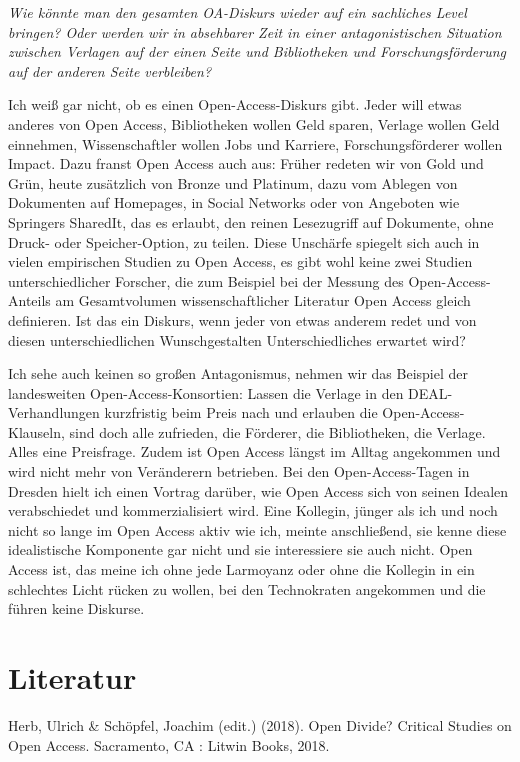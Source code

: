 \documentclass[a4paper,
fontsize=11pt,
oneside,
numbers=noperiodatend,
parskip=half-,
bibliography=totoc,
final
]{scrartcl}
\begin{document}
\emph{Wie könnte man den gesamten OA-Diskurs wieder auf ein sachliches
Level bringen? Oder werden wir in absehbarer Zeit in einer
antagonistischen Situation zwischen Verlagen auf der einen Seite und
Bibliotheken und Forschungsförderung auf der anderen Seite verbleiben?}

Ich weiß gar nicht, ob es einen Open-Access-Diskurs gibt. Jeder will
etwas anderes von Open Access, Bibliotheken wollen Geld sparen, Verlage
wollen Geld einnehmen, Wissenschaftler wollen Jobs und Karriere,
Forschungsförderer wollen Impact. Dazu franst Open Access auch aus:
Früher redeten wir von Gold und Grün, heute zusätzlich von Bronze und
Platinum, dazu vom Ablegen von Dokumenten auf Homepages, in Social
Networks oder von Angeboten wie Springers SharedIt, das es erlaubt, den
reinen Lesezugriff auf Dokumente, ohne Druck- oder Speicher-Option, zu
teilen. Diese Unschärfe spiegelt sich auch in vielen empirischen Studien
zu Open Access, es gibt wohl keine zwei Studien unterschiedlicher
Forscher, die zum Beispiel bei der Messung des Open-Access-Anteils am
Gesamtvolumen wissenschaftlicher Literatur Open Access gleich
definieren. Ist das ein Diskurs, wenn jeder von etwas anderem redet und
von diesen unterschiedlichen Wunschgestalten Unterschiedliches erwartet
wird?

Ich sehe auch keinen so großen Antagonismus, nehmen wir das Beispiel der
landesweiten Open-Access-Konsortien: Lassen die Verlage in den
DEAL-Verhandlungen kurzfristig beim Preis nach und erlauben die
Open-Access-Klauseln, sind doch alle zufrieden, die Förderer, die
Bibliotheken, die Verlage. Alles eine Preisfrage. Zudem ist Open Access
längst im Alltag angekommen und wird nicht mehr von Veränderern
betrieben. Bei den Open-Access-Tagen in Dresden hielt ich einen Vortrag
darüber, wie Open Access sich von seinen Idealen verabschiedet und
kommerzialisiert wird. Eine Kollegin, jünger als ich und noch nicht so
lange im Open Access aktiv wie ich, meinte anschließend, sie kenne diese
idealistische Komponente gar nicht und sie interessiere sie auch nicht.
Open Access ist, das meine ich ohne jede Larmoyanz oder ohne die
Kollegin in ein schlechtes Licht rücken zu wollen, bei den Technokraten
angekommen und die führen keine Diskurse.

\section*{Literatur}\label{literatur}

Herb, Ulrich \& Schöpfel, Joachim (edit.) (2018). Open Divide? Critical
Studies on Open Access. Sacramento, CA : Litwin Books, 2018.
\end{document}
